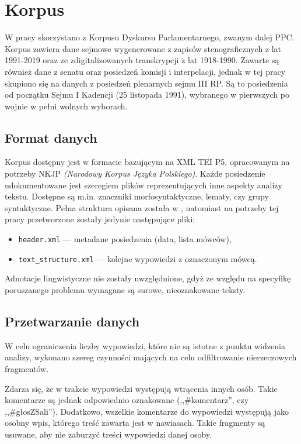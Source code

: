 
\chapter{Korpus}
  W pracy skorzystano z Korpusu Dyskursu Parlamentarnego\cite{PPC}, zwanym dalej PPC.
  Korpus zawiera dane sejmowe wygenerowane z zapisów stenograficznych z lat 1991-2019
    oraz ze zdigitalizowanych transkrypcji z lat 1918-1990.
  Zawarte są również dane z senatu oraz posiedzeń komisji i interpelacji,
    jednak w tej pracy skupiono się na danych z posiedzeń plenarnych sejmu III RP.
  Są to posiedzenia od początku Sejmu I Kadencji (25 listopada 1991), wybranego w pierwszych po wojnie w pełni wolnych wyborach.

\section{Format danych}
  Korpus dostępny jest w formacie bazującym na XML TEI P5, opracowanym na potrzeby NKJP \textit{(Narodowy Korpus Języka Polskiego)}.
  Każde posiedzenie udokumentowane jest szeregiem plików reprezentujących inne aspekty analizy tekstu.
  Dostępne są m.in. znaczniki morfosyntaktyczne, lematy, czy grupy syntaktyczne.
  Pełna struktura opisana została w \cite[Ogrodniczuk, 2012]{PSC},
    natomiast na potrzeby tej pracy przetworzone zostały jedynie następujące pliki:
  \begin{itemize}
    \item \verb|header.xml| --- metadane posiedzenia (data, lista mówców),
    \item \verb|text_structure.xml| --- kolejne wypowiedzi z oznaczonym mówcą.
  \end{itemize}
  Adnotacje lingwistyczne nie zostały uwzględnione,
    gdyż ze względu na specyfikę poruszanego problemu wymagane są surowe, nieoznakowane teksty.
  
\section{Przetwarzanie danych}
  W celu ograniczenia liczby wypowiedzi, które nie są istotne z punktu widzenia analizy,
    wykonano szereg czynności mających na celu odfiltrowanie nierzeczowych fragmentów.
  
  Zdarza się, że w trakcie wypowiedzi występują wtrącenia innych osób.
  Takie komentarze są jednak odpowiednio oznakowane (,,\#komentarz'', czy ,,\#głosZSali'').
  Dodatkowo, wszelkie komentarze do wypowiedzi występują jako osobny wpis, którego treść zawarta jest w nawiasach.
  Takie fragmenty są usuwane, aby nie zaburzyć treści wypowiedzi danej osoby.

